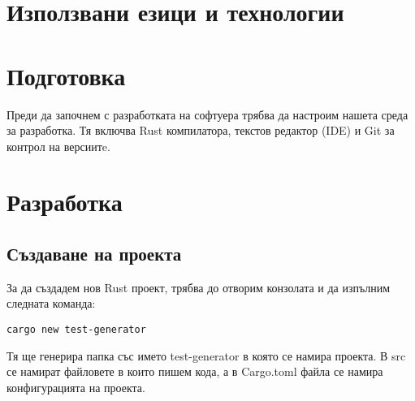\section{Използвани езици и технологии}



%
%

\newpage




\newpage

\section{Подготовка}
Преди да започнем с разработката на софтуера трябва да настроим нашета среда за
разработка. Тя включва Rust компилатора, текстов редактор (IDE) и Git за
контрол на версиитe.


\newpage



\newpage

\section{Разработка}

\subsection{Създаване на проекта}
За да създадем нов Rust проект, трябва до отворим конзолата и да изпълним следната команда:
\begin{lstlisting}
cargo new test-generator
\end{lstlisting}

Тя ще генерира папка със името test-generator в която се намира проекта.
В src се намират файловете в които пишем кода, а в Cargo.toml файла се намира
конфигурацията на проекта.

